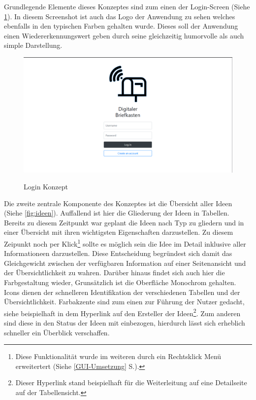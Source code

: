 Grundlegende Elemente dieses Konzeptes sind zum einen der Login-Screen (Siehe \cref{fig:login}).
In diesem Screenshot ist auch das Logo der Anwendung zu sehen welches ebenfalls in den typischen Farben gehalten wurde. Dieses soll der Anwendung einen Wiedererkennungswert geben durch seine gleichzeitig humorvolle als auch simple Darstellung.

\begin{figure}[hbt]
\centering
\begin{minipage}[t]{1\textwidth}
    \caption{Login Konzept}
    \includegraphics[width=1\textwidth]{img/login-konzept.png}\\
    \label{fig:login}
\end{minipage}
\end{figure}

Die zweite zentrale Komponente des Konzeptes ist die Übersicht aller Ideen (Siehe \cref{fig:ideen}).
Auffallend ist hier die Gliederung der Ideen in Tabellen. Bereits zu diesem Zeitpunkt war geplant die Ideen nach Typ zu gliedern und in einer Übersicht mit ihren wichtigsten Eigenschaften darzustellen. 
Zu diesem Zeipunkt noch per Klick\footnote{Diese Funktionalität wurde im weiteren durch ein Rechtsklick Menü erweitertert (Siehe \ref{GUI-Umsetzung} S.\pageref{GUI-Umsetzung}).} sollte es möglich sein die Idee im Detail inklusive aller Informationeen darzustellen. Diese Entscheidung begründest sich damit das Gleichgewicht zwischen der verfügbaren Information auf einer Seitenansicht und der Übersichtlichkeit zu wahren.
Darüber hinaus findet sich auch hier die Farbgestaltung wieder, Grunsätzlich ist die Oberfläche Monochrom gehalten. Icons dienen der schnelleren Identifikation der verschiedenen Tabellen und der Übersichtlichkeit. Farbakzente sind zum einen zur Führung der Nutzer gedacht, siehe beispielhaft in dem Hyperlink auf den Ersteller der Ideen\footnote{Dieser Hyperlink stand beispielhaft für die Weiterleitung auf eine Detailseite auf der Tabellensicht.}. Zum anderen sind diese in den Status der Ideen mit einbezogen, hierdurch lässt sich erheblich schneller ein Überblick verschaffen.

